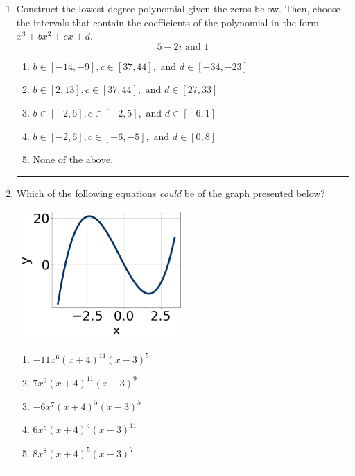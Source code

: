 \documentclass[14pt]{extbook}
\newcommand{\litem}[1]{\item#1\hspace*{-1cm}\rule{\textwidth}{0.4pt}}
\begin{document}
\begin{enumerate}
{\begin{enumerate}[label=\Alph*.]
\end{enumerate} }
\litem{
Construct the lowest-degree polynomial given the zeros below. Then, choose the intervals that contain the coefficients of the polynomial in the form $x^3+bx^2+cx+d$.\[ 5 - 2 i \text{ and } 1 \]\begin{enumerate}[label=\Alph*.]
\item \( b \in [-14, -9], c \in [37, 44], \text{ and } d \in [-34, -23] \)
\item \( b \in [2, 13], c \in [37, 44], \text{ and } d \in [27, 33] \)
\item \( b \in [-2, 6], c \in [-2, 5], \text{ and } d \in [-6, 1] \)
\item \( b \in [-2, 6], c \in [-6, -5], \text{ and } d \in [0, 8] \)
\item \( \text{None of the above.} \)

\end{enumerate} }
\litem{
Which of the following equations \textit{could} be of the graph presented below?
\begin{center}
    \includegraphics[width=0.5\textwidth]{../Figures/polyGraphToFunctionCopyC.png}
\end{center}
\begin{enumerate}[label=\Alph*.]
\item \( -11x^{6} (x + 4)^{11} (x - 3)^{5} \)
\item \( 7x^{9} (x + 4)^{11} (x - 3)^{9} \)
\item \( -6x^{7} (x + 4)^{5} (x - 3)^{5} \)
\item \( 6x^{8} (x + 4)^{4} (x - 3)^{11} \)
\item \( 8x^{8} (x + 4)^{5} (x - 3)^{7} \)


\end{enumerate}}
\end{enumerate}
\end{document}
